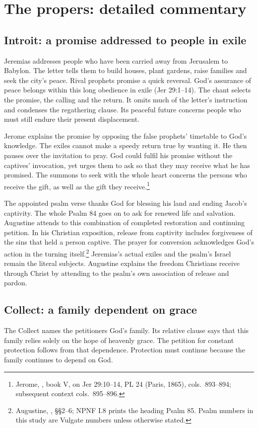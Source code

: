 \section{The propers: detailed commentary}
\label{detailed-commentary}
\subsection{Introit: a promise addressed to people in exile}
Jeremias addresses people who have been carried away from Jerusalem to
Babylon. The letter tells them to build houses, plant gardens, raise
families and seek the city's peace. Rival prophets promise a quick reversal.
God's assurance of peace belongs within this long obedience in exile
(Jer 29:1--14). The chant selects the promise, the calling and the return.
It omits much of the letter's instruction and condenses the regathering
clause. Its peaceful future concerns people who must still endure their
present displacement.

Jerome explains the promise by opposing the false prophets' timetable to
God's knowledge. The exiles cannot make a speedy return true by wanting it.
He then pauses over the invitation to pray. God could fulfil his promise
without the captives' invocation, yet urges them to ask so that they may
receive what he has promised. The summons to seek with the whole heart
concerns the persons who receive the gift, as well as the gift they
receive.\footnote{Jerome, , book V,
on Jer 29:10--14, PL 24 (Paris, 1865), cols.~893--894; subsequent
context cols.~895--896.}

The appointed psalm verse thanks God for blessing his land and ending
Jacob's captivity. The whole Psalm 84 goes on to ask for renewed life and
salvation. Augustine attends to this combination of completed restoration
and continuing petition. In his Christian exposition, release from captivity
includes forgiveness of the sins that held a person captive. The prayer for
conversion acknowledges God's action in the turning itself.\footnote{Augustine,
, §§2--6; NPNF I.8 prints the heading
Psalm 85. Psalm numbers in this study are Vulgate numbers unless otherwise
stated.} Jeremias's actual exiles and the psalm's Israel remain the
literal subjects. Augustine explains the freedom Christians receive through
Christ by attending to the psalm's own association of release and pardon.

\subsection{Collect: a family dependent on grace}
The Collect names the petitioners God's family. Its relative clause says
that this family relies solely on the hope of heavenly grace. The petition
for constant protection follows from that dependence. Protection must
continue because the family continues to depend on God.

